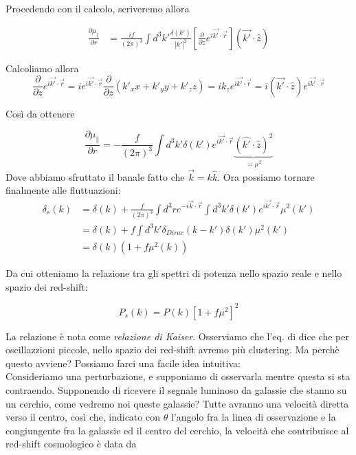 \documentclass{report}
\begin{document}
Procedendo con il calcolo, scriveremo allora

\begin{align}
    \frac{\partial \mu_{\parallel}}{\partial r} &= \frac{if}{(2\pi)^3}\int d^3k' \frac{\delta(k')}{|k'|^2}\left[\frac{\partial}{\partial z}e^{i\vec{k'}\cdot \vec{r}}\right](\vec{k'}\cdot \hat{z})
\end{align}

Calcoliamo allora 
\begin{equation}
    \frac{\partial}{\partial z}e^{i\vec{k'}\cdot \vec{r}} = ie^{i\vec{k'}\cdot \vec{r}}\frac{\partial}{\partial z}(k'_xx + k'_y y + k'_zz) = ik_z e^{i\vec{k'}\cdot \vec{r}} = i(\vec{k'}\cdot \hat{z})e^{i\vec{k'}\cdot \vec{r}}
\end{equation}

Così da ottenere

\begin{equation}
    \frac{\partial \mu_{\parallel}}{\partial r} = -\frac{f}{(2\pi)^3}\int d^3k' \delta(k')e^{i\vec{k'}\cdot \vec{r}}\underbrace{(\hat{k'}\cdot \hat{z})^2}_{= \mu^2}
\end{equation}
Dove abbiamo sfruttato il banale fatto che $\vec{k} = k\hat{k}$. Ora possiamo tornare finalmente alle fluttuazioni: 
\begin{align}
    \delta_s(k) &= \delta(k) + \frac{f}{(2\pi)^3}\int d^3r e^{-i\vec{k}\cdot \vec{r}}\int d^3k' \delta(k')e^{i\vec{k'}\cdot \vec{r}}\mu^2(k') \\
    &= \delta(k) + f\int d^3 k' \delta_{Dirac}(k-k')\delta(k')\mu^2(k') \\
    &= \delta(k)(1 + f\mu^2(k))
\end{align}

Da cui otteniamo la relazione tra gli spettri di potenza nello spazio reale e nello spazio dei red-shift: 
\begin{tcolorbox}[colback=gray!15, colframe=black, boxrule=1pt]
\begin{equation}
    P_s(k) = P(k)\left[1+f\mu^2\right]^2
\end{equation}
\end{tcolorbox}

La relazione è nota come \emph{relazione di Kaiser}. Osserviamo che l'eq. di dice che per oscillazzioni piccole, nello spazio dei red-shift avremo più clustering. Ma perchè questo avviene? Possiamo farci una facile idea intuitiva: \\

Consideriamo una perturbazione, e supponiamo di osservarla mentre questa si sta contraendo. Supponendo di ricevere il segnale luminoso da galassie che stanno su un cerchio, come vedremo noi queste galassie? Tutte avranno una velocità diretta verso il centro, così che, indicato con $\theta$ l'angolo fra la linea di osservazione e la congiungente fra la galassie ed il centro del cerchio, la velocità che contribuisce al red-shift cosmologico è data da 
\end{document}
